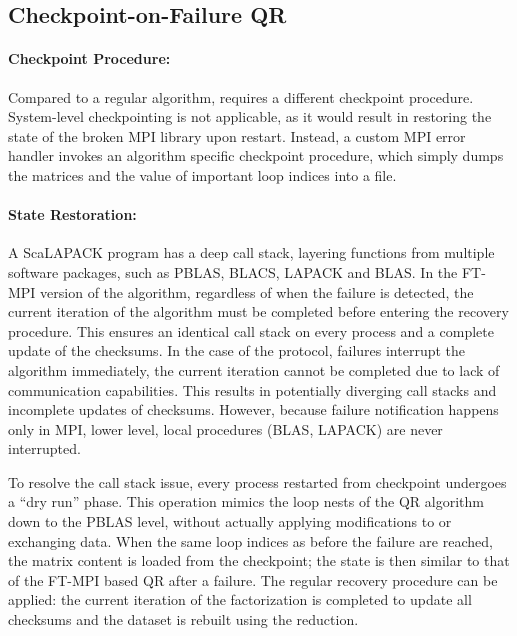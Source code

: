 \subsection{Checkpoint-on-Failure QR}

\paragraph*{Checkpoint Procedure:} Compared to a regular \abft
algorithm, \cof requires a different checkpoint
procedure. System-level checkpointing is not applicable, as it would result
in restoring the state of the broken MPI library upon restart. Instead,
a custom MPI error handler invokes an algorithm specific checkpoint
procedure, which simply dumps the matrices and the value of important
loop indices into a file.

\paragraph*{State Restoration:} A ScaLAPACK program has a deep call
stack, layering functions from multiple software packages, such as
PBLAS, BLACS, LAPACK and BLAS. In the FT-MPI version of the algorithm,
regardless of when the failure is detected, the current iteration of the
algorithm must be completed before entering the recovery procedure. This
ensures an identical call stack on every process and a complete update
of the checksums. In the case of the \cof protocol, failures interrupt
the algorithm immediately, the current iteration cannot be completed due
to lack of communication capabilities. This results in potentially
diverging call stacks and incomplete updates of checksums. However,
because failure notification happens only in MPI, lower level, local
procedures (BLAS, LAPACK) are never interrupted.

To resolve the call stack issue, every process restarted from checkpoint
undergoes a ``dry run'' phase. This operation mimics the loop nests of the
QR algorithm down to the PBLAS level, without actually applying
modifications to or exchanging data. When the same loop indices as
before the failure are reached, the matrix content is loaded from the
checkpoint; the state is then similar to that of the FT-MPI based \abft
QR after a failure. The regular recovery procedure can be applied: the
current iteration of the factorization is completed to update all
checksums and the dataset is rebuilt using the \abft reduction.

